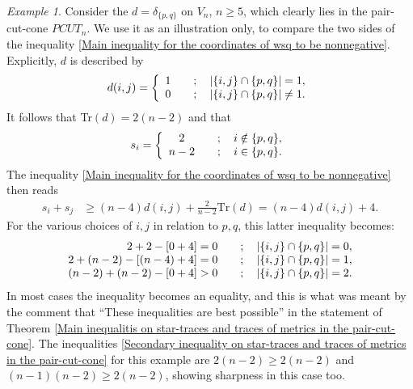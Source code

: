 \documentclass[12pt]{amsart}
\numberwithin{theorem}{section}
\theoremstyle{remark}
\newtheorem{example}[theorem]{Example}
\begin{document}
\begin{example} \label{Example of a single cut semimetric}
Consider the $d=\delta_{\{p,q\}}$ on $V_n$, $n\ge 5$, which clearly lies in the pair-cut-cone $PCUT_n$. We use it as an illustration only, to compare the two sides of the inequality \eqref{Main inequality for the coordinates of wsq to be nonnegative}. Explicitly, $d$ is described by 
$$
d(i,j) =\left\{
\begin{array}{cl}
1 & \quad ; \quad |\{i,j\} \cap \{p,q\}| = 1, \cr 
0 & \quad ; \quad |\{i,j\} \cap \{p,q\}| \ne 1. 	
\end{array} 
\right.
$$
It follows that Tr$(d) = 2(n-2)$ and that 
$$
s_i =\left\{
\begin{array}{cl}
	2 & \quad ; \quad i\notin\{ p,q\}, \cr 
	n-2 & \quad ; \quad i\in \{p,q\}. 	
\end{array} 
\right.
$$
The inequality  \eqref{Main inequality for the coordinates of wsq to be nonnegative} then reads 
\begin{align*}
s_i + s_j & \ge  (n-4)d(i,j) +  \frac{2}{n-2}\text{Tr}(d) =  (n-4)d(i,j) +  4.
\end{align*} 
For the various choices of $i,j$ in relation to $p,q$, this latter inequality becomes: 
$$ 
\begin{array}{rl}
2+ 2 - [0 +4  ] = 0 & \quad ; \quad |\{i,j\}\cap \{p,q\}|=0, \cr 
2+ (n-2) - [(n-4) +4  ] = 0 & \quad ; \quad |\{i,j\}\cap \{p,q\}|=1, \cr 
(n-2)+ (n-2) - [0 +4  ] > 0 & \quad ; \quad |\{i,j\}\cap \{p,q\}|=2. 
\end{array} 
$$
In most cases the inequality becomes an equality, and this is what was meant by the comment that ``These inequalities are best possible'' in the statement of Theorem \ref{Main inequalitis on star-traces and traces of metrics in the pair-cut-cone}. The inequalities \eqref{Secondary inequality on star-traces and traces of metrics in the pair-cut-cone} for this example are $2(n-2)\ge 2(n-2)$ and $(n-1)(n-2) \ge 2(n-2)$, showing sharpness in this case too. 
\end{example}
\vskip5mm
\end{document}
